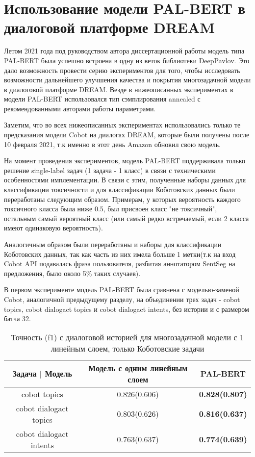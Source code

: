 \section{Использование модели PAL-BERT в диалоговой платформе DREAM} 

Летом 2021 года под руководством автора диссертационной работы модель типа PAL-BERT \cite{stickland_2019} была успешно встроена в одну из веток библиотеки DeepPavlov. Это дало возможность провести серию экспериментов для того, чтобы исследовать возможности дальнейшего улучшения качества и покрытия многозадачной модели в диалоговой платформе DREAM. Везде в нижеописанных экспериментах в модели PAL-BERT использовался тип сэмплирования annealed с рекомендованными авторами работы \cite{stickland_2019} параметрами.

Заметим, что во всех нижеописанных экспериментах использовались только те предсказания модели Cobot на диалогах DREAM, которые были получены после 10 февраля 2021, т.к именно в этот день Amazon обновил свою модель.

На момент проведения экспериментов, модель PAL-BERT поддерживала только решение single-label задач (1 задача - 1 класс) в связи с техническими особенностями имплементации. В связи с этим, полученные наборы данных для классификации токсичности и для классификации Коботовских данных были переработаны следующим образом. Примерам, у которых вероятность каждого токсичного класса была ниже 0.5, был присвоен класс "не токсичный", остальным самый вероятный класс (или самый редко встречаемый, если 2 класса имеют одинаковую вероятность).

Аналогичным образом были переработаны и наборы для классификации Коботовских данных, так как часть из них имела больше 1 метки(т.к на вход Cobot API подавалась фраза пользователя, разбитая аннотатором SentSeg на предложения, было около 5\% таких случаев). 

В первом эксперименте модель PAL-BERT была сравнена с моделью-заменой Cobot, аналогичной предыдущему разделу, на объединении трех задач - cobot topics, cobot dialogact topics и cobot dialogact intents, без истории и с размером батча 32.

\begin{table}[htbp]
\centering
\caption {Точность (f1) с диалоговой историей для многозадачной модели с 1 линейным слоем, только Коботовские задачи}
\label{mtldream:3}
\begin{tabular}{|c||c|c|} \hline
Задача | Модель & Модель с одним линейным слоем & PAL-BERT \\
\hline
\hline
cobot topics & 0.826(0.606) & \textbf{0.828(0.807)} \\
\hline
cobot dialogact topics & 0.803(0.626) & \textbf{0.816(0.637)} \\
\hline
cobot dialogact intents & 0.763(0.637) & \textbf{0.774(0.639)} \\ 
\hline
\end{tabular}
\end{table}

